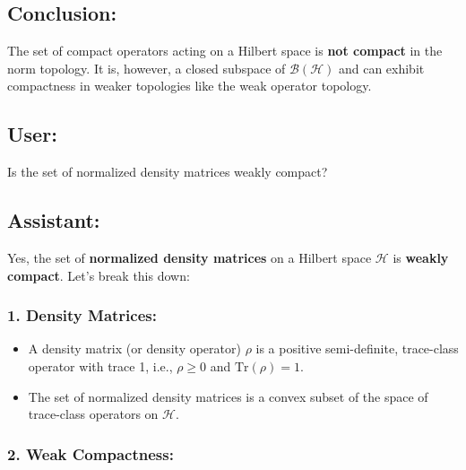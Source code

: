 \documentclass{article}
\begin{document}
\subsection*{Conclusion:}

The set of compact operators acting on a Hilbert space is \textbf{not compact%
} in the norm topology. It is, however, a closed subspace of $\mathcal{B}(%
\mathcal{H})$ and can exhibit compactness in weaker topologies like the weak
operator topology.

\subsection*{User:}

Is the set of normalized density matrices weakly compact?

\subsection*{Assistant:}

Yes, the set of \textbf{normalized density matrices} on a Hilbert space $%
\mathcal{H}$ is \textbf{weakly compact}. Let's break this down:

\subsubsection*{1. \textbf{Density Matrices}:}

\begin{itemize}
\item A density matrix (or density operator) $\rho$ is a positive
semi-definite, trace-class operator with trace 1, i.e., $\rho \geq 0$ and $%
\text{Tr}(\rho) = 1$. 

\item The set of normalized density matrices is a convex subset of the space
of trace-class operators on $\mathcal{H}$.
\end{itemize}

\subsubsection*{2. \textbf{Weak Compactness}:}
\end{document}
